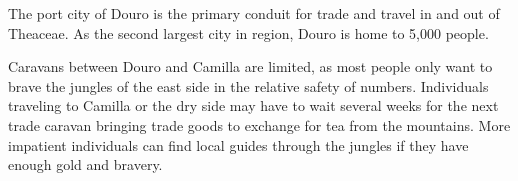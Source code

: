 The port city of Douro is the primary conduit for trade and travel in and out of Theaceae.
As the second largest city in region, Douro is home to 5,000 people.

Caravans between Douro and Camilla are limited, as most people only want to brave the jungles of the east side in the relative safety of numbers.
Individuals traveling to Camilla or the dry side may have to wait several weeks for the next trade caravan bringing trade goods to exchange for tea from the mountains.
More impatient individuals can find local guides through the jungles if they have enough gold and bravery.
